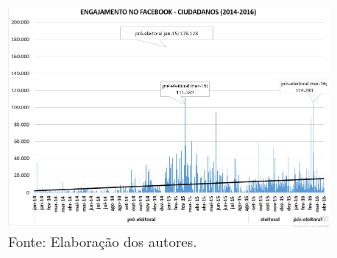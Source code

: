 \begin{center}
\begin{figure}[!htpb]
\centering
 \includegraphics[width=85mm]{./imgs/graf6_4.png}
\caption{Fonte: Elaboração dos autores.}
\end{figure}
\end{center}
\pagebreak

